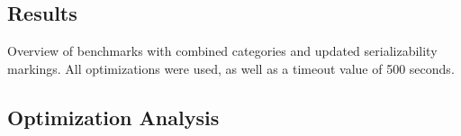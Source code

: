 \subsection{Results}



\begin{table}[H]
	\centering
	
	\caption{Overview of benchmarks with combined categories and updated serializability markings. All optimizations were used, as well as a timeout value of 500 seconds.}
\label{tab:benchmarks-all}
\end{table}


\subsection{Optimization Analysis}







